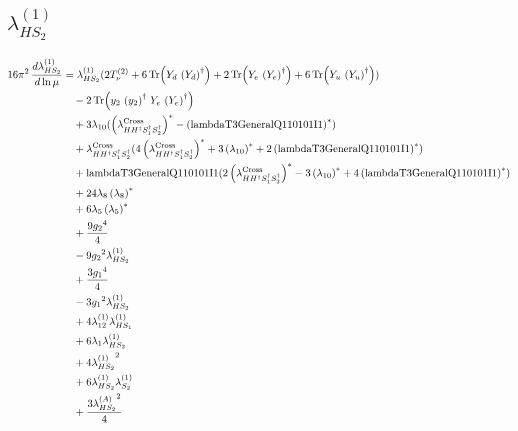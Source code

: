 \documentclass[10pt,a4paper]{article}
\begin{document}
\subsection*{$\lambda_{HS_2}^{(1)}$}
\begin{align*}
16\pi^2\,\frac{d \lambda_{HS_2}^{(1)}}{d\ln\mu} &={\lambda_{HS_2}^{(1)}} (2 T_{\nu}^{(2)}+6 \operatorname{Tr}\!\left({Y_d}\,\left({Y_d}\right)^{\dagger}\right)+2 \operatorname{Tr}\!\left({Y_e}\,\left({Y_e}\right)^{\dagger}\right)+6 \operatorname{Tr}\!\left({Y_u}\,\left({Y_u}\right)^{\dagger}\right)) \\
&\quad -2 \operatorname{Tr}\!\left({y_2}\,\left({y_2}\right)^{\dagger}\,{Y_e}\,\left({Y_e}\right)^{\dagger}\right) \\
&\quad +3 {\lambda_{10}} (\left({\lambda_{H H^\dagger S_1^\dagger S_2^\dagger}^{\rm Cross}}\right)^{*}-\left(\text{lambdaT3GeneralQ110101I1}\right)^{*}) \\
&\quad +{\lambda_{H H^\dagger S_1^\dagger S_2^\dagger}^{\rm Cross}} (4 \left({\lambda_{H H^\dagger S_1^\dagger S_2^\dagger}^{\rm Cross}}\right)^{*}+3 \left({\lambda_{10}}\right)^{*}+2 \left(\text{lambdaT3GeneralQ110101I1}\right)^{*}) \\
&\quad +\text{lambdaT3GeneralQ110101I1} (2 \left({\lambda_{H H^\dagger S_1^\dagger S_2^\dagger}^{\rm Cross}}\right)^{*}-3 \left({\lambda_{10}}\right)^{*}+4 \left(\text{lambdaT3GeneralQ110101I1}\right)^{*}) \\
&\quad +24 {\lambda_{8}} \left({\lambda_{8}}\right)^{*} \\
&\quad +6 {\lambda_5} \left({\lambda_5}\right)^{*} \\
&\quad +\frac{9 {g_2}^4}{4} \\
&\quad -9 {g_2}^2 {\lambda_{HS_2}^{(1)}} \\
&\quad +\frac{3 {g_1}^4}{4} \\
&\quad -3 {g_1}^2 {\lambda_{HS_2}^{(1)}} \\
&\quad +4 {\lambda_{12}^{(1)}} {\lambda_{HS_1}^{(1)}} \\
&\quad +6 {\lambda_1} {\lambda_{HS_2}^{(1)}} \\
&\quad +4 {\lambda_{HS_2}^{(1)}}^2 \\
&\quad +6 {\lambda_{HS_2}^{(1)}} {\lambda_{S_2}^{(1)}} \\
&\quad +\frac{3 {\lambda_{HS_2}^{(A)}}^2}{4} \\
\end{align*}
\end{document}
